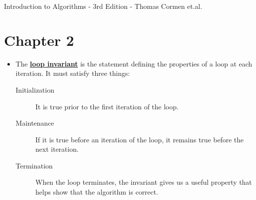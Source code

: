 \documentclass[12pt]{article}
\newcommand{\definition}[1]{\underline{\textbf{#1}}}
\begin{document}
Introduction to Algorithms - 3rd Edition - Thomas Cormen et.al.

\section*{Chapter 2}

\begin{itemize}

  \item The \definition{loop invariant} is the statement defining the properties of a loop at each iteration. It must satisfy three things:
  \begin{description}
      \item[Initialization] It is true prior to the first iteration of the loop.
      \item[Maintenance] If it is true before an iteration of the loop, it remains true before the next iteration.
      \item[Termination] When the loop terminates, the invariant gives us a useful property that helps show that the algorithm is correct.
  \end{description}

\end{itemize}
\end{document}
